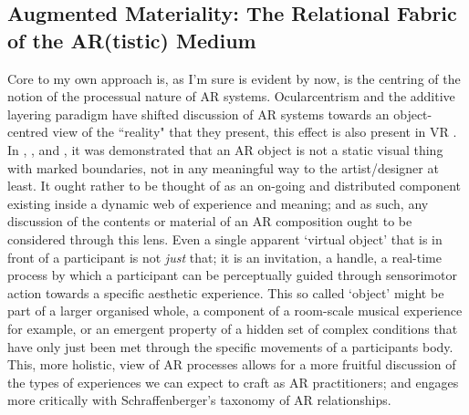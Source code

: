 \subsection[Augmented Materiality]{Augmented Materiality: The Relational Fabric of the AR(tistic) Medium} \label{sec: discussion-medium-material}
Core to my own approach is, as I'm sure is evident by now, is the centring of the notion of the processual nature of AR systems. Ocularcentrism and the additive layering paradigm have shifted discussion of AR systems towards an object-centred view of the ``reality" that they present, this effect is also present in VR \citep[]{hovhannisyan2019}. In \textit{}, \textit{}, and \textit{}, it was demonstrated that an AR object is not a static visual thing with marked boundaries, not in any meaningful way to the artist/designer at least. It ought rather to be thought of as an on-going and distributed component existing inside a dynamic web of experience and meaning; and as such, any discussion of the contents or material of an AR composition ought to be considered through this lens. Even a single apparent `virtual object' that is in front of a participant is not \textit{just} that; it is an invitation, a handle, a real-time process by which a participant can be perceptually guided through sensorimotor action towards a specific aesthetic experience. This so called `object' might be part of a larger organised whole, a component of a room-scale musical experience for example, or an emergent property of a hidden set of complex conditions that have only just been met through the specific movements of a participants body. This, more holistic, view of AR processes allows for a more fruitful discussion of the types of experiences we can expect to craft as AR practitioners; and engages more critically with Schraffenberger's taxonomy of AR relationships.

